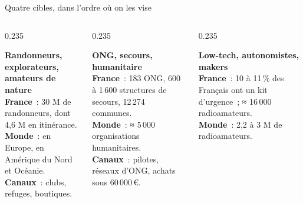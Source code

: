 \begin{frame}{Quatre cibles, dans l'ordre où on les vise}
  \begin{columns}[T]
    \begin{column}{0.235\textwidth}
      \begin{carte}[height=4.55cm,valign=top,title={1 · Départ},colbacktitle=mkA,coltitle=white,fonttitle=\sffamily\bfseries\scriptsize]
        \raggedright{\sffamily\bfseries\footnotesize Randonneurs, explorateurs, amateurs de nature}\\[3pt]
        \scriptsize\textbf{France}~: 30 M de randonneurs, dont 4,6 M en itinérance.\\[2pt]
        \textbf{Monde}~:  en Europe,  en Amérique du Nord et Océanie.\\[3pt]
        {\bfseries\color{insarouge}Canaux}~: clubs, refuges, boutiques.
      \end{carte}
    \end{column}
    \begin{column}{0.235\textwidth}
      \begin{carte}[height=4.55cm,valign=top,title={2 · Preuve d'usage},colbacktitle=mkB,coltitle=black,fonttitle=\sffamily\bfseries\scriptsize]
        \raggedright{\sffamily\bfseries\footnotesize ONG, secours, humanitaire}\\[3pt]
        \scriptsize\textbf{France}~: 183 ONG, 600 à 1\,600 structures de secours, 12\,274 communes.\\[2pt]
        \textbf{Monde}~: ≈ 5\,000 organisations humanitaires.\\[3pt]
        {\bfseries\color{insarouge}Canaux}~: pilotes, réseaux d'ONG, achats sous 60\,000\,€.
      \end{carte}
    \end{column}
    \begin{column}{0.235\textwidth}
      \begin{carte}[height=4.55cm,valign=top,title={3 · Relais d'opinion},colbacktitle=mkC,coltitle=white,fonttitle=\sffamily\bfseries\scriptsize]
        \raggedright{\sffamily\bfseries\footnotesize Low-tech, autonomistes, makers}\\[3pt]
        \scriptsize\textbf{France}~: 10 à 11\,\% des Français ont un kit d'urgence~; ≈ 16\,000 radioamateurs.\\[2pt]
        \textbf{Monde}~: 2,2 à 3 M de radioamateurs.\\[3pt]

\end{carte}
\end{column}
\end{columns}
\end{frame}
